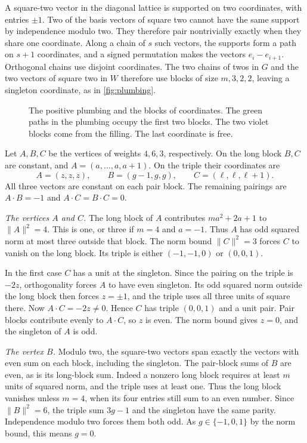 A square-two vector in the diagonal lattice is supported on two coordinates, with entries $\pm1$. Two of the basis vectors of square two cannot have the same support by independence modulo two. They therefore pair nontrivially exactly when they share one coordinate. Along a chain of $s$ such vectors, the supports form a path on $s+1$ coordinates, and a signed permutation makes the vectors $e_i-e_{i+1}$. Orthogonal chains use disjoint coordinates. The two chains of twos in $G$ and the two vectors of square two in $W$ therefore use blocks of size $m,3,2,2$, leaving a singleton coordinate, as in \autoref{fig:plumbing}.

\begin{figure}[!ht]
 \centering
 
 \caption{The positive plumbing and the blocks of coordinates. The green paths in the plumbing occupy the first two blocks. The two violet blocks come from the filling. The last coordinate is free.}
 \label{fig:plumbing}
\end{figure}

Let $A,B,C$ be the vertices of weights $4,6,3$, respectively. On the long block $B,C$ are constant, and $A=(a,\ldots,a,a+1)$. On the triple their coordinates are
\[
 A=(z,z,z),\qquad B=(g-1,g,g),\qquad C=(\ell,\ell,\ell+1).
\]
All three vectors are constant on each pair block. The remaining pairings are $A\cdot B=-1$ and $A\cdot C=B\cdot C=0$.

\smallskip
\noindent\emph{The vertices $A$ and $C$.}
The long block of $A$ contributes $ma^2+2a+1$ to $\lVert A\rVert^2=4$. This is one, or three if $m=4$ and $a=-1$. Thus $A$ has odd squared norm at most three outside that block. The norm bound $\lVert C\rVert^2=3$ forces $C$ to vanish on the long block. Its triple is either $(-1,-1,0)$ or $(0,0,1)$.

In the first case $C$ has a unit at the singleton. Since the pairing on the triple is $-2z$, orthogonality forces $A$ to have even singleton. Its odd squared norm outside the long block then forces $z=\pm1$, and the triple uses all three units of square there. Now $A\cdot C=-2z\ne0$. Hence $C$ has triple $(0,0,1)$ and a unit pair. Pair blocks contribute evenly to $A\cdot C$, so $z$ is even. The norm bound gives $z=0$, and the singleton of $A$ is odd.

\smallskip
\noindent\emph{The vertex $B$.}
Modulo two, the square-two vectors span exactly the vectors with even sum on each block, including the singleton. The pair-block sums of $B$ are even, as is its long-block sum. Indeed a nonzero long block requires at least $m$ units of squared norm, and the triple uses at least one. Thus the long block vanishes unless $m=4$, when its four entries still sum to an even number. Since $\lVert B\rVert^2=6$, the triple sum $3g-1$ and the singleton have the same parity. Independence modulo two forces them both odd. As $g\in\{-1,0,1\}$ by the norm bound, this means $g=0$.

